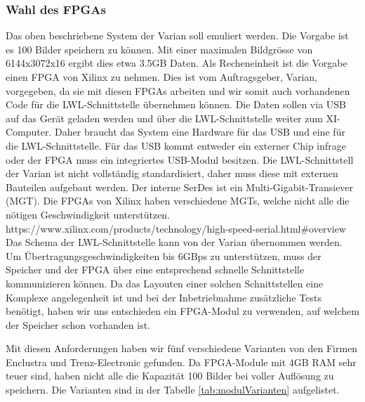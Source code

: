 \documentclass{article}
\begin{document}
\subsubsection*{Wahl des FPGAs}
Das oben beschriebene System der Varian soll emuliert werden. Die Vorgabe ist es 100 Bilder speichern zu können. Mit einer maximalen Bildgrösse von 6144x3072x16 ergibt dies etwa 3.5GB Daten. Als Recheneinheit ist die Vorgabe einen FPGA von Xilinx zu nehmen. Dies ist vom Auftragsgeber, Varian, vorgegeben, da sie mit diesen FPGAs arbeiten und wir somit auch vorhandenen Code für die LWL-Schnittstelle übernehmen können. Die Daten sollen via USB auf das Gerät geladen werden und über die LWL-Schnittstelle weiter zum XI-Computer. Daher braucht das System eine Hardware für das USB und eine für die LWL-Schnittstelle. Für das USB kommt entweder ein externer Chip infrage oder der FPGA muss ein integriertes USB-Modul besitzen. Die LWL-Schnittstell der Varian ist nicht vollständig standardisiert, daher muss diese mit externen Bauteilen aufgebaut werden. Der interne SerDes ist ein Multi-Gigabit-Transiever (MGT). Die FPGAs von Xilinx haben verschiedene MGTs, welche nicht alle die nötigen Geschwindigkeit unterstützen. https://www.xilinx.com/products/technology/high-speed-serial.html\#overview Das Schema der LWL-Schnittstelle kann von der Varian übernommen werden. Um Übertragungsgeschwindigkeiten bis 6GBps zu unterstützen, muss der Speicher und der FPGA über eine entsprechend schnelle Schnittstelle kommunizieren können. Da das Layouten einer solchen Schnittstellen eine Komplexe angelegenheit ist und bei der Inbetriebnahme zusätzliche Tests benötigt, haben wir uns entschieden ein FPGA-Modul zu verwenden, auf welchem der Speicher schon vorhanden ist. 

Mit diesen Anforderungen haben wir fünf verschiedene Varianten von den Firmen Enclustra und Trenz-Electronic gefunden. Da FPGA-Module mit 4GB RAM sehr teuer sind, haben nicht alle die Kapazität 100 Bilder bei voller Auflösung zu speichern. Die Varianten sind in der Tabelle \ref{tab:modulVarianten} aufgelistet.
\end{document}
